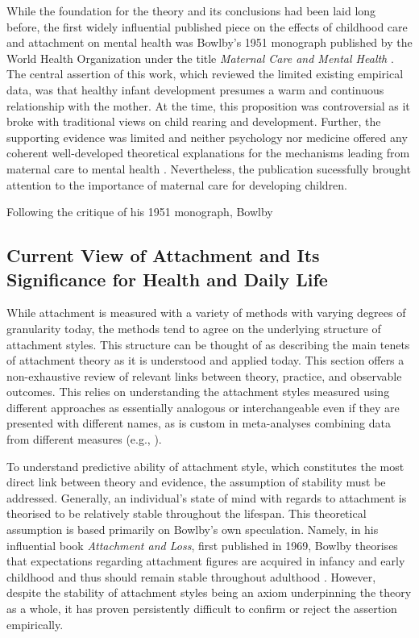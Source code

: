 \documentclass[12pt]{report}
\begin{document}
While the foundation for the theory and its conclusions had been laid long before, the first widely influential published piece on the effects of childhood care and attachment on mental health was Bowlby's 1951 monograph published by the World Health Organization under the title \textit{Maternal Care and Mental Health} \cite{bowlby1951WHO}. The central assertion of this work, which reviewed the limited existing empirical data, was that healthy infant development presumes a warm and continuous relationship with the mother. At the time, this proposition was controversial as it broke with traditional views on child rearing and development. Further, the supporting evidence was limited and neither psychology nor medicine offered any coherent well-developed theoretical explanations for the mechanisms leading from maternal care to mental health \cite{Bowlby1988, who1962deprivation}. Nevertheless, the publication sucessfully brought attention to the importance of maternal care for developing children.

Following the critique of his 1951 monograph, Bowlby 

\subsection{Current View of Attachment and Its Significance for Health and Daily Life}
While attachment is measured with a variety of methods with varying degrees of granularity today, the methods tend to agree on the underlying structure of attachment styles. This structure can be thought of as describing the main tenets of attachment theory as it is understood and applied today. This section offers a non-exhaustive review of relevant links between theory, practice, and observable outcomes. This relies on understanding the attachment styles measured using different approaches as essentially analogous or interchangeable even if they are presented with different names, as is custom in meta-analyses combining data from different measures (e.g., \cite{McConnell2011,Pinquart2013}).

To understand predictive ability of attachment style, which constitutes the most direct link between theory and evidence, the assumption of stability must be addressed. Generally, an individual's state of mind with regards to attachment is theorised to be relatively stable throughout the lifespan. This theoretical assumption is based primarily on Bowlby's own speculation. Namely, in his influential book \textit{Attachment and Loss}, first published in 1969, Bowlby theorises that expectations regarding attachment figures are acquired in infancy and early childhood and thus should remain stable throughout adulthood \cite{bowlby1982attachment}. However, despite the stability of attachment styles being an axiom underpinning the theory as a whole, it has proven persistently difficult to confirm or reject the assertion empirically.
\end{document}
